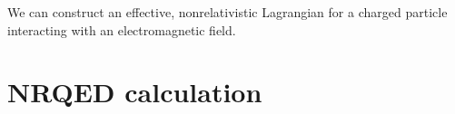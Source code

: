 



We can construct an effective, nonrelativistic Lagrangian for a charged particle interacting with an electromagnetic field.

%
\chapter{NRQED calculation}



